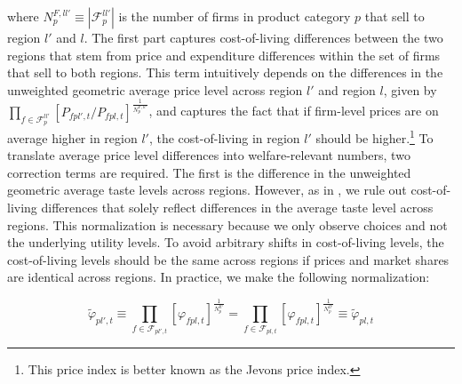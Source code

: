 \noindent where $N^{F,ll'}_{p} \equiv |\mathcal{F}^{ll'}_{p}|$ is the number of firms in product category $p$ that sell to region $l'$ and $l$. The first part captures cost-of-living differences between the two regions that stem from price and expenditure differences within the set of firms that sell to both regions. This term intuitively depends on the differences in the unweighted geometric average price level across region $l'$ and region $l$, given by $\prod_{f \in \mathcal{F}^{ll'}_{p}} \left[P_{fpl',t}\bigg /P_{fpl,t}\right]^{\frac{1}{N^{F,ll'}_{p}}}$, and captures the fact that if firm-level prices are on average higher in region $l'$, the cost-of-living in region $l'$ should be higher.\footnote{This price index is better known as the Jevons price index.} To translate average price level differences into welfare-relevant numbers, two correction terms are required. The first is the difference in the unweighted geometric average taste levels across regions. However, as in \citet{Redding2020}, we rule out cost-of-living differences that solely reflect differences in the average taste level across regions. This normalization is necessary because we only observe choices and not the underlying utility levels. To avoid arbitrary shifts in cost-of-living levels, the cost-of-living levels should be the same across regions if prices and market shares are identical across regions. In practice, we make the following normalization: 
\begin{linenomath*}
    \begin{equation*}
    \tilde{\varphi}_{pl',t} \equiv 
        \prod_{f \in \mathcal{F}_{pl',t}} 
        \left[\varphi_{fpl,t} \right]^{\frac{1}{N^{ll'}_{p}}} 
    = 
        \prod_{f \in \mathcal{F}_{pl,t}} 
        \left[\varphi_{fpl,t} \right]^{\frac{1}{N^{ll'}_{p}}}
    \equiv  \tilde{\varphi}_{pl,t} 
\end{equation*}
\end{linenomath*}
